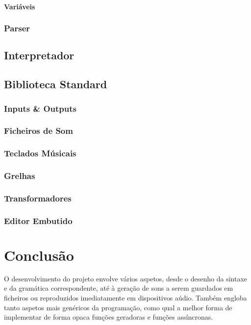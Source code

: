 \documentclass[
  oneside,
  11pt, a4paper,
  footinclude=true,
  headinclude=true,
  cleardoublepage=empty
]{scrbook}
\begin{document}
	\subsubsection{\textbf{Variáveis}}
	
	\subsection{Parser}
	\section{Interpretador}
	\section{Biblioteca Standard}
	\subsection{Inputs \& Outputs}
	\subsection{Ficheiros de Som}
	\subsection{Teclados Músicais}
	\subsection{Grelhas}
	\subsection{Transformadores}
	\subsection{Editor Embutido}
	

	\chapter{Conclusão}
	O desenvolvimento do projeto envolve vários aspetos, desde o desenho da sintaxe e da gramática correspondente, até à geração de sons a serem guardados em ficheiros ou reproduzidos imediatamente em dispositivos aúdio. Também engloba tanto aspetos mais genéricos da programação, como qual a melhor forma de implementar de forma opaca funções geradoras e funções assíncronas.
	
\end{document}
